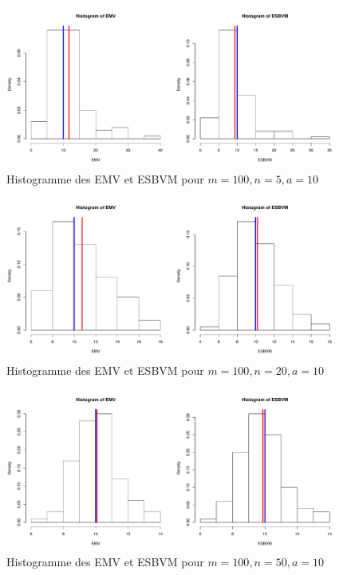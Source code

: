 \documentclass[12pt]{article}
\begin{document}
\begin{enumerate}
\begin{figure}[H]
\centering
\includegraphics[width=1.0\textwidth]{figures/GraphP2Q31.pdf}
\caption{Histogramme des EMV et ESBVM pour $m=100, n=5, a=10$}
\label{graphe2}
\end{figure}

\begin{figure}[H]
\centering
\includegraphics[width=1.0\textwidth]{figures/GraphP2Q32.pdf}
\caption{Histogramme des EMV et ESBVM pour $m=100, n=20,   a=10$}
\label{graph3}
\end{figure}

\begin{figure}[H]
\centering
\includegraphics[width=1.0\textwidth]{figures/GraphP2Q33.pdf}
\caption{Histogramme des EMV et ESBVM pour $m=100, n=50, a=10$}
\label{graphe4}
\end{figure}


\end{enumerate}
\end{document}
